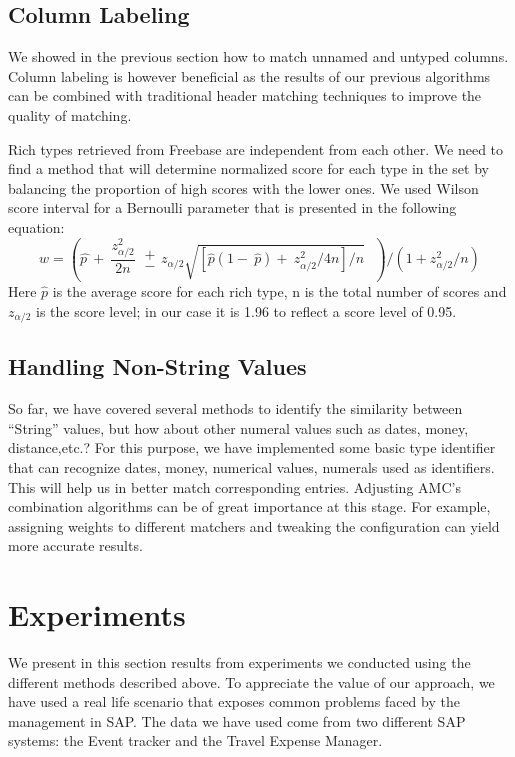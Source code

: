 \documentclass{../../Util/LaTEX/sig-alternate}
\begin{document}
\subsection{Column Labeling}
We showed in the previous section how to match unnamed and untyped columns. Column labeling is however beneficial as the results of our previous algorithms can be combined with traditional header matching techniques to improve the quality of matching.

Rich types retrieved from Freebase are independent from each other. We need to find a method that will determine normalized score for each type in the set by balancing the proportion of high scores with the lower ones. We used Wilson score interval for a Bernoulli parameter that is presented in the following equation:
\[w={\left(\widehat{p\ }+\ \frac{z^2_{{\alpha }/{2}}}{2n}\  \begin{array}{c}
+ \\
- \end{array}
z_{{\alpha }/{2}}\sqrt{{\left[\hat{p}\left(1-\ \hat{p}\right)+\ {z^2_{{\alpha }/{2}}}/{4n}\right]}/{n}}\ \ \ \right)}/{\left(1+{z^2_{{\alpha }/{2}}}/{n}\right)}\]
Here $\hat{p}$ is the average score for each rich type, n is the total number of scores and $z_{{\alpha }/{2}}$ is the score level; in our case it is 1.96 to reflect a score level of 0.95.

\subsection{Handling Non-String Values}
So far, we have covered several methods to identify the similarity between ``String'' values, but how about other numeral values such as dates, money, distance,etc.? For this purpose, we have implemented some basic type identifier that can recognize dates, money, numerical values, numerals used as identifiers. This will help us in better match corresponding entries. Adjusting AMC's combination algorithms can be of great importance at this stage. For example, assigning weights to different matchers and tweaking the configuration can yield more accurate results.



\section{Experiments}
We present in this section results from experiments we conducted using the different methods described above. To appreciate the value of our approach, we have used a real life scenario that exposes common problems faced by the management in SAP. The data we have used come from two different SAP systems: the Event tracker and the Travel Expense Manager.
\end{document}

